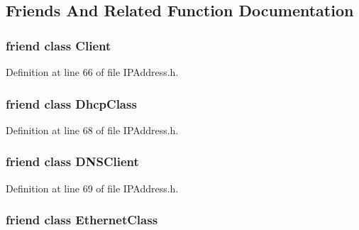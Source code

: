 \subsection{Friends And Related Function Documentation}
\hypertarget{class_i_p_address_a5db1c99e2c94b26278f3838c85cdb618}{}
\subsubsection[{Client}]{\setlength{\rightskip}{0pt plus 5cm}friend class {\bf Client}\hspace{0.3cm}{\ttfamily [friend]}}\label{class_i_p_address_a5db1c99e2c94b26278f3838c85cdb618}


Definition at line 66 of file I\+P\+Address.\+h.

\hypertarget{class_i_p_address_afef6ad9b691e32ea60d87db719e23e15}{}
\subsubsection[{Dhcp\+Class}]{\setlength{\rightskip}{0pt plus 5cm}friend class Dhcp\+Class\hspace{0.3cm}{\ttfamily [friend]}}\label{class_i_p_address_afef6ad9b691e32ea60d87db719e23e15}


Definition at line 68 of file I\+P\+Address.\+h.

\hypertarget{class_i_p_address_a14acdf960f52e4a43740d57e81a27c40}{}
\subsubsection[{D\+N\+S\+Client}]{\setlength{\rightskip}{0pt plus 5cm}friend class D\+N\+S\+Client\hspace{0.3cm}{\ttfamily [friend]}}\label{class_i_p_address_a14acdf960f52e4a43740d57e81a27c40}


Definition at line 69 of file I\+P\+Address.\+h.

\hypertarget{class_i_p_address_a9a150ffc237e50529b3d0d50cc83a4d7}{}
\subsubsection[{Ethernet\+Class}]{\setlength{\rightskip}{0pt plus 5cm}friend class Ethernet\+Class\hspace{0.3cm}{\ttfamily [friend]}}\label{class_i_p_address_a9a150ffc237e50529b3d0d50cc83a4d7}


